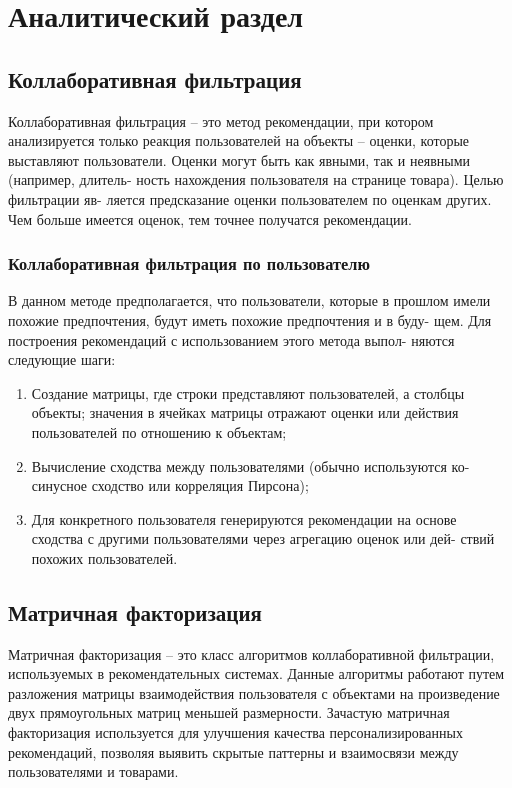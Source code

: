 \documentclass[12pt]{report}
\begin{document}
\pagebreak

\pagebreak


\chapter{Аналитический раздел}

\section{Коллаборативная фильтрация}
Коллаборативная фильтрация – это метод рекомендации, при котором анализируется только реакция пользователей на объекты – оценки, которые выставляют пользователи.
Оценки могут быть как явными, так и неявными (например, длитель- ность нахождения пользователя на странице товара). Целью фильтрации яв- ляется предсказание оценки пользователем по оценкам других. Чем больше имеется оценок, тем точнее получатся рекомендации. 
\subsection{Коллаборативная фильтрация по пользователю}

В данном методе предполагается, что пользователи, которые в прошлом имели похожие предпочтения, будут иметь похожие предпочтения и в буду- щем. Для построения рекомендаций с использованием этого метода выпол- няются следующие шаги:
\begin{enumerate}
    \item Создание матрицы, где строки представляют пользователей, а столбцы объекты; значения в ячейках матрицы отражают оценки или действия пользователей по отношению к объектам;
    \item Вычисление сходства между пользователями (обычно используются ко- синусное сходство или корреляция Пирсона);
    \item Для конкретного пользователя генерируются рекомендации на основе сходства с другими пользователями через агрегацию оценок или дей- ствий похожих пользователей.
\end{enumerate}

\section{Матричная факторизация}
Матричная факторизация -- это класс алгоритмов коллаборативной фильтрации, используемых в рекомендательных системах. Данные алгоритмы работают путем разложения матрицы взаимодействия пользователя с объектами на произведение двух прямоугольных матриц меньшей размерности. Зачастую матричная факторизация используется для улучшения качества персонализированных рекомендаций, позволяя выявить скрытые паттерны и взаимосвязи между пользователями и товарами.\cite{factorization}
\end{document}

